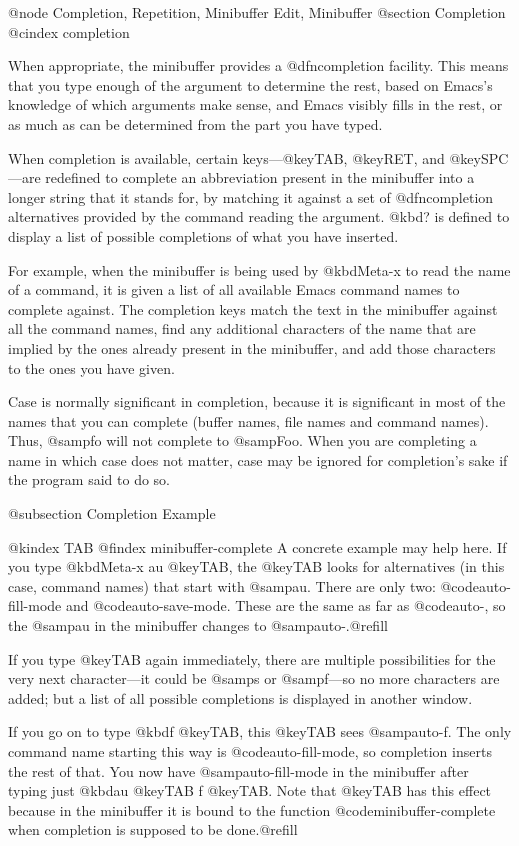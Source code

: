 {{{{{{@node Completion, Repetition, Minibuffer Edit, Minibuffer
@section Completion
@cindex completion

  When appropriate, the minibuffer provides a @dfn{completion} facility.
This means that you type enough of the argument to determine the rest,
based on Emacs's knowledge of which arguments make sense, and Emacs visibly
fills in the rest, or as much as can be determined from the part you have
typed.

  When completion is available, certain keys---@key{TAB}, @key{RET}, and @key{SPC}---are
redefined to complete an abbreviation present in the minibuffer into a
longer string that it stands for, by matching it against a set of
@dfn{completion alternatives} provided by the command reading the argument.
@kbd{?} is defined to display a list of possible completions of what you
have inserted.

  For example, when the minibuffer is being used by @kbd{Meta-x} to read
the name of a command, it is given a list of all available Emacs command
names to complete against.  The completion keys match the text in the
minibuffer against all the command names, find any additional characters of
the name that are implied by the ones already present in the minibuffer,
and add those characters to the ones you have given.

  Case is normally significant in completion, because it is significant in
most of the names that you can complete (buffer names, file names and
command names).  Thus, @samp{fo} will not complete to @samp{Foo}.  When you
are completing a name in which case does not matter, case may be ignored
for completion's sake if the program said to do so.

@subsection Completion Example

@kindex TAB
@findex minibuffer-complete
  A concrete example may help here.  If you type @kbd{Meta-x au @key{TAB}},
the @key{TAB} looks for alternatives (in this case, command names) that
start with @samp{au}.  There are only two: @code{auto-fill-mode} and
@code{auto-save-mode}.  These are the same as far as @code{auto-}, so the
@samp{au} in the minibuffer changes to @samp{auto-}.@refill

  If you type @key{TAB} again immediately, there are multiple possibilities
for the very next character---it could be @samp{s} or @samp{f}---so no more
characters are added; but a list of all possible completions is displayed
in another window.

  If you go on to type @kbd{f @key{TAB}}, this @key{TAB} sees
@samp{auto-f}.  The only command name starting this way is
@code{auto-fill-mode}, so completion inserts the rest of that.  You
now have @samp{auto-fill-mode} in the minibuffer after typing just @kbd{au
@key{TAB} f @key{TAB}}.  Note that @key{TAB} has this effect because in the
minibuffer it is bound to the function @code{minibuffer-complete} when
completion is supposed to be done.@refill

}}}}}}
